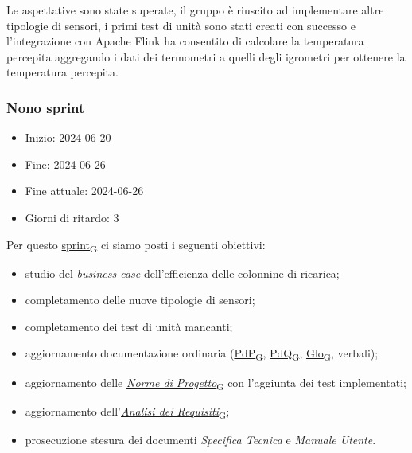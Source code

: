 Le aspettative sono state superate, il gruppo è riuscito ad implementare altre tipologie di sensori, i primi test di unità sono stati creati con successo e l'integrazione con Apache Flink ha consentito di calcolare la temperatura percepita aggregando i dati dei termometri a quelli degli igrometri per ottenere la temperatura percepita. 



\newpage
\subsubsection{Nono sprint}
\begin{itemize}
	\item Inizio: 2024-06-20
	\item Fine: 2024-06-26
	\item Fine attuale: 2024-06-26
	\item Giorni di ritardo: 3
\end{itemize}

Per questo \href{https://7last.github.io/docs/pb/documentazione-interna/glossario\#sprint}{sprint\textsubscript{G}} ci siamo posti i seguenti obiettivi:
\begin{itemize}
	\item studio del \textit{business case} dell'efficienza delle colonnine di ricarica;
	\item completamento delle nuove tipologie di sensori;
	\item completamento dei test di unità mancanti;
	\item aggiornamento documentazione ordinaria (\href{https://7last.github.io/docs/pb/documentazione-interna/glossario\#piano-di-progetto}{PdP\textsubscript{G}}, \href{https://7last.github.io/docs/pb/documentazione-interna/glossario\#piano-di-qualifica}{PdQ\textsubscript{G}}, \href{https://7last.github.io/docs/pb/documentazione-interna/glossario\#glossario}{Glo\textsubscript{G}}, verbali);
	\item aggiornamento delle \href{https://7last.github.io/docs/pb/documentazione-interna/glossario\#norme-di-progetto}{\textit{Norme di Progetto}\textsubscript{G}} con l'aggiunta dei test implementati;
	\item aggiornamento dell'\href{https://7last.github.io/docs/pb/documentazione-interna/glossario\#analisi-dei-requisiti}{\textit{Analisi dei Requisiti}\textsubscript{G}};
	\item prosecuzione stesura dei documenti \textit{Specifica Tecnica} e \textit{Manuale Utente}.
\end{itemize}

